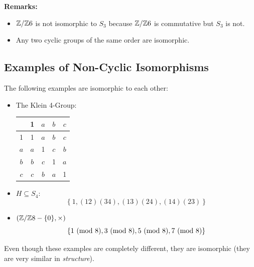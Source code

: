 \documentclass[letterpaper]{article}
\begin{document}
\textbf{Remarks:}
\begin{itemize}
    \item $\mathbb{Z} / \mathbb{Z} 6$ is not isomorphic to $S_3$ because $\mathbb{Z} / \mathbb{Z} 6$ is commutative but $S_3$ is not. 
    \item Any two cyclic groups of the same order are isomorphic. 
\end{itemize} 

\subsection{Examples of Non-Cyclic Isomorphisms}
The following examples are isomorphic to each other: 
\begin{itemize}
    \item The Klein 4-Group: 
    \begin{center}
        \begin{tabular}{c|c|c|c|c}
                & 1 & $a$ & $b$ & $c$ \\ 
            \hline 
            1   & 1 & $a$ & $b$ & $c$ \\ 
            $a$ & $a$ & 1 & $c$ & $b$ \\ 
            $b$ & $b$ & $c$ & 1 & $a$ \\ 
            $c$ & $c$ & $b$ & $a$ & 1
        \end{tabular}
    \end{center}

    \item $H \subseteq S_4$: 
    \[\left\{1, (12)(34), (13)(24), (14)(23)\right\}\]

    \item $(\mathbb{Z} / \mathbb{Z} 8 - \{0\}, \times)$
    \[\{1 \ (\mathrm{mod}\ 8), 3 \ (\mathrm{mod}\ 8), 5 \ (\mathrm{mod}\ 8), 7 \ (\mathrm{mod}\ 8)\}\]
\end{itemize}
Even though these examples are completely different, they are isomorphic (they are very similar in \emph{structure}). 
\end{document}

